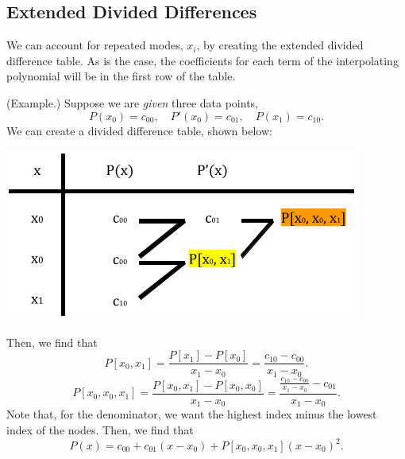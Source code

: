 \documentclass[letterpaper]{article}
\begin{document}
\subsection{Extended Divided Differences}
We can account for repeated modes, $x_i$, by creating the extended divided difference table. As is the case, the coefficients for each term of the interpolating polynomial will be in the first row of the table.
\begin{mdframed}
    (Example.) Suppose we are \emph{given} three data points, 
    \[P(x_0) = c_{00}, \quad P'(x_0) = c_{01}, \quad P(x_1) = c_{10}.\]
    We can create a divided difference table, shown below: 
    \begin{center}
        \includegraphics[scale=0.8]{../assets/hermite_example_ext.png}
    \end{center}

    Then, we find that 
    \[P[x_0, x_1] = \frac{P[x_1] - P[x_0]}{x_1 - x_0} = \frac{c_{10} - c_{00}}{x_1 - x_0}.\]
    \[P[x_0, x_0, x_1] = \frac{P[x_0, x_1] - P[x_0, x_0]}{x_1 - x_0} = \frac{\frac{c_{10} - c_{00}}{x_1 - x_0} - c_{01}}{x_1 - x_0}.\]
    Note that, for the denominator, we want the highest index minus the lowest index of the nodes. Then, we find that 
    \[P(x) = c_{00} + c_{01}(x - x_0) + P[x_0, x_0, x_1](x - x_0)^2.\]
\end{mdframed}
\end{document}
